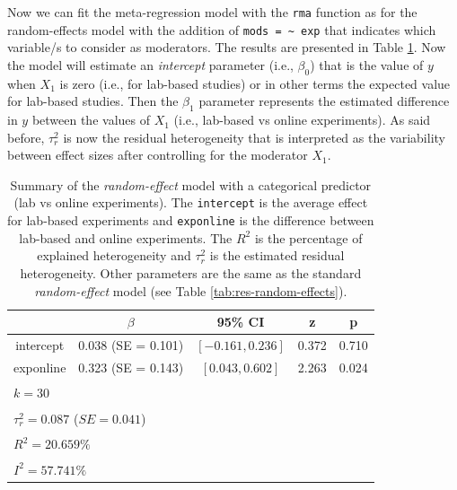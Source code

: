 \documentclass[
  man,floatsintext]{apa6}
\begin{document}
\normalsize

Now we can fit the meta-regression model with the \texttt{rma} function as for the random-effects model with the addition of \texttt{mods\ =\ \textasciitilde{}\ exp} that indicates which variable/s to consider as moderators. The results are presented in Table \ref{tab:res-meta-reg-dummy}. Now the model will estimate an \emph{intercept} parameter (i.e., \(\beta_0\)) that is the value of \(y\) when \(X_1\) is zero (i.e., for lab-based studies) or in other terms the expected value for lab-based studies. Then the \(\beta_1\) parameter represents the estimated difference in \(y\) between the values of \(X_1\) (i.e., lab-based vs online experiments). As said before, \color{red} \(\tau^2_r\) \color{black} is now the residual heterogeneity that is interpreted as the variability between effect sizes after controlling for the moderator \(X_1\).

\scriptsize

\begin{table}[H]

\caption{\label{tab:res-meta-reg-dummy}\color{red} Summary of the \emph{random-effect} model with a categorical predictor (lab vs online experiments). The \texttt{intercept} is the average effect for lab-based experiments and \texttt{exponline} is the difference between lab-based and online experiments. The \(R^2\) is the percentage of explained heterogeneity and \(\tau^2_r\) is the estimated residual heterogeneity. Other parameters are the same as the standard \emph{random-effect} model (see Table \ref{tab:res-random-effects}). \color{black}}
\centering
\fontsize{9}{11}\selectfont
\begin{tabular}[t]{ccccc}
\toprule
 & $\beta$ & 95\% CI & z & p\\
\midrule
intercept & 0.038 (SE = 0.101) & $[-0.161, 0.236]$ & 0.372 & 0.710\\
exponline & 0.323 (SE = 0.143) & $[0.043, 0.602]$ & 2.263 & 0.024\\
\bottomrule
\multicolumn{5}{l}{\textsuperscript{} $k = 30$}\\
\multicolumn{5}{l}{\textsuperscript{} $\tau^2_r = 0.087$ ($SE = 0.041$)}\\
\multicolumn{5}{l}{\textsuperscript{} $R^2 = 20.659\%$}\\
\multicolumn{5}{l}{\textsuperscript{} $I^2 = 57.741\%$}\\
\end{tabular}
\end{table}
\end{document}
